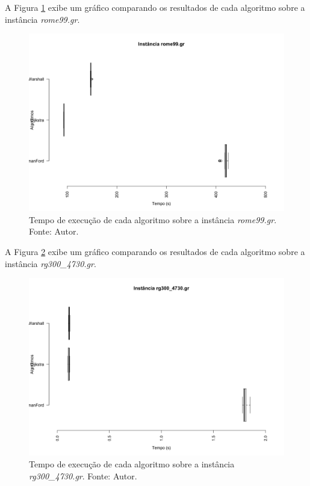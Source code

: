 \documentclass[12pt]{article}
\begin{document}
A Figura \ref{fig:rome} exibe um gráfico comparando os resultados de cada algoritmo sobre a instância \textit{rome99.gr}.

\begin{figure}[H]
  \centering
    \includegraphics[width=1\textwidth]{img/rome99.png}
  \caption{Tempo de execução de cada algoritmo sobre a instância \textit{rome99.gr}. Fonte: Autor.}
  \label{fig:rome}
\end{figure}


A Figura \ref{fig:rg300_4730} exibe um gráfico comparando os resultados de cada algoritmo sobre a instância \textit{ rg300\_4730.gr}.

\begin{figure}[H]
  \centering
    \includegraphics[width=1\textwidth]{img/rg300_4730.png}
  \caption{Tempo de execução de cada algoritmo sobre a instância \textit{rg300\_4730.gr}. Fonte: Autor.}
  \label{fig:rg300_4730}
\end{figure}
\end{document}
